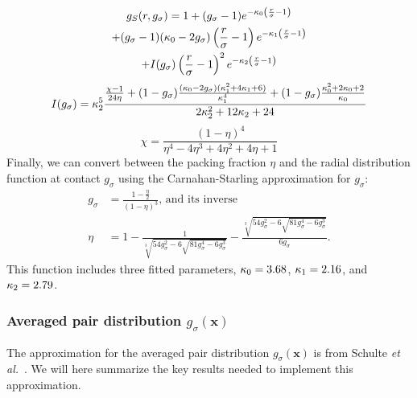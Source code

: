 \documentclass[letterpaper,twocolumn,amsmath,amssymb,pre,aps,10pt]{revtex4-1}
\newcommand\rr{\mathbf{x}}
\begin{document}
\begin{multline}
  g_S(r,g_\sigma) = 1 + (g_\sigma-1) e^{-\kappa_0 \left(\frac{r}{\sigma}-1\right)} \\
  + (g_\sigma -1)(\kappa_0 - 2g_\sigma)  \left(\frac{r}{\sigma}-1\right)e^{-\kappa_1  \left(\frac{r}{\sigma}-1\right)} \\
  + I(g_\sigma)  \left(\frac{r}{\sigma}-1\right)^2e^{-\kappa_2  \left(\frac{r}{\sigma}-1\right)}
\end{multline}
\begin{equation}
  I(g_\sigma) = \kappa_2^5 \frac{
    \frac{\chi-1}{24\eta} + (1-g_\sigma) \frac{(\kappa_0-2
      g_\sigma)(\kappa_1^2 + 4 \kappa_1 + 6)}{\kappa_1^4}
    + (1-g_\sigma)\frac{\kappa_0^2 + 2\kappa_0 + 2}{\kappa_0}
  }{2 \kappa_2^2 + 12 \kappa_2 + 24}
\end{equation}
\begin{equation}
  \chi = \frac{(1-\eta)^4}{\eta^4 - 4\eta^3 + 4\eta^2 + 4\eta + 1}
\end{equation}
Finally, we can convert between the packing fraction $\eta$ and the
radial distribution function at contact $g_\sigma$ using the
Carnahan-Starling approximation for $g_\sigma$:
\newcommand\nastyetacuberoot{\sqrt[3]{54 g_\sigma^2 -
    6\sqrt{81g_\sigma^4 - 6g_\sigma^3}}}
\begin{align}
  g_\sigma &= \frac{1-\tfrac{\eta}{2}}{(1-\eta)^3}\text{, and its inverse} \\
  \eta &= 1 - \frac{1}{\nastyetacuberoot} - \frac{\nastyetacuberoot}{6g_\sigma}.
\end{align}
This function includes three fitted parameters, $\kappa_0 =
3.68$, $\kappa_1 = 2.16$,
and $\kappa_2 = 2.79$.


\subsubsection{Averaged pair distribution  $g_\sigma(\rr)$}

The approximation for the averaged pair distribution $g_\sigma(\rr)$
is from Schulte \emph{et al.}~\cite{schulte2012using}.  We will here
summarize the key results needed to implement this approximation.

\end{document}
